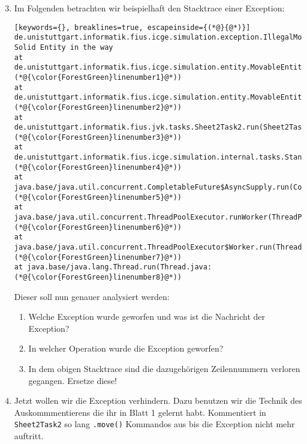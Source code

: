 \begin{enumerate}[label=\alph*)] \setcounter{enumi}{2}
    \item Im Folgenden betrachten wir beispielhaft den Stacktrace einer Exception:
        \begin{lstlisting}[keywords={}, breaklines=true, escapeinside={(*@}{@*)}]
de.unistuttgart.informatik.fius.icge.simulation.exception.IllegalMoveException: Solid Entity in the way
at de.unistuttgart.informatik.fius.icge.simulation.entity.MovableEntity.internalMove(MovableEntity.java:(*@{\color{ForestGreen}linenumber1}@*))
at de.unistuttgart.informatik.fius.icge.simulation.entity.MovableEntity.move(MovableEntity.java:(*@{\color{ForestGreen}linenumber2}@*))
at de.unistuttgart.informatik.fius.jvk.tasks.Sheet2Task2.run(Sheet2Task2.java:(*@{\color{ForestGreen}linenumber3}@*))
at de.unistuttgart.informatik.fius.icge.simulation.internal.tasks.StandardTaskRunner.executeTask(StandardTaskRunner.java:(*@{\color{ForestGreen}linenumber4}@*))
at java.base/java.util.concurrent.CompletableFuture$AsyncSupply.run(CompletableFuture.java:(*@{\color{ForestGreen}linenumber5}@*))
at java.base/java.util.concurrent.ThreadPoolExecutor.runWorker(ThreadPoolExecutor.java:(*@{\color{ForestGreen}linenumber6}@*))
at java.base/java.util.concurrent.ThreadPoolExecutor$Worker.run(ThreadPoolExecutor.java:(*@{\color{ForestGreen}linenumber7}@*))
at java.base/java.lang.Thread.run(Thread.java:(*@{\color{ForestGreen}linenumber8}@*))
        \end{lstlisting}

        Dieser soll nun genauer analysiert werden:

        \begin{enumerate}
            \item[i)] Welche Exception wurde geworfen und was ist die Nachricht der Exception?
            \item[ii)] In welcher Operation wurde die Exception geworfen?
            \item[iii)] In dem obigen Stacktrace sind die dazugehörigen Zeilennummern verloren gegangen. Ersetze diese!  
        \end{enumerate}

    \item Jetzt wollen wir die Exception verhindern.
        Dazu benutzen wir die Technik des Auskommmentierens die ihr in Blatt 1 gelernt habt.
        Kommentiert in \lstinline{Sheet2Task2} so lang \lstinline{.move()} Kommandos aus bis die Exception nicht mehr auftritt.


\end{enumerate}
